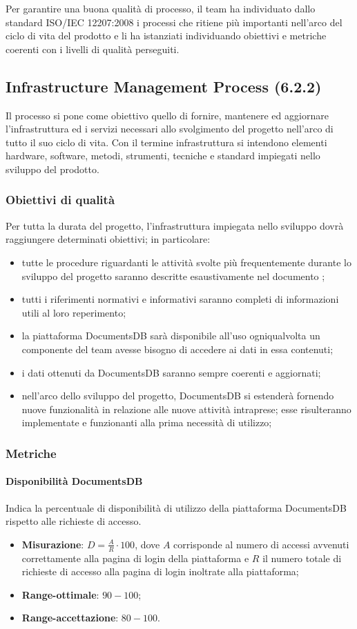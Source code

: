 Per garantire una buona qualità di processo, il team ha individuato dallo standard ISO/IEC 12207:2008 i processi che ritiene più importanti nell'arco del ciclo di vita del prodotto e li ha istanziati individuando obiettivi e metriche coerenti con i livelli di qualità perseguiti.
\subsection{Infrastructure Management Process (6.2.2)}
Il processo si pone come obiettivo quello di fornire, mantenere ed aggiornare l'infrastruttura ed i servizi necessari allo svolgimento del progetto nell'arco di tutto il suo ciclo di vita. Con il termine infrastruttura si intendono elementi hardware, software, metodi, strumenti, tecniche e standard impiegati nello sviluppo del prodotto.
\subsubsection{Obiettivi di qualità}
Per tutta la durata del progetto, l'infrastruttura impiegata nello sviluppo dovrà raggiungere determinati obiettivi; in particolare:
\begin{itemize}
\item tutte le procedure riguardanti le attività svolte più frequentemente durante lo sviluppo del progetto saranno descritte esaustivamente nel documento \textit{\NdP};
\item tutti i riferimenti normativi e informativi saranno completi di informazioni utili al loro reperimento;
\item la piattaforma DocumentsDB sarà disponibile all'uso ogniqualvolta un componente del team avesse bisogno di accedere ai dati in essa contenuti;
\item i dati ottenuti da DocumentsDB saranno sempre coerenti e aggiornati;
\item nell'arco dello sviluppo del progetto, DocumentsDB si estenderà fornendo nuove funzionalità in relazione alle nuove attività intraprese; esse risulteranno implementate e funzionanti alla prima necessità di utilizzo;
\end{itemize}
\subsubsection{Metriche}
\paragraph{Disponibilità DocumentsDB}
\label{dispDocumentsDB}
Indica la percentuale di disponibilità di utilizzo della piattaforma DocumentsDB rispetto alle richieste di accesso.
\begin{itemize}
\item \textbf{Misurazione}: $ D = \frac{A}{R} \cdot 100 $, dove $A$ corrisponde al numero di accessi avvenuti correttamente alla pagina di login della piattaforma e $R$ il numero totale di richieste di accesso alla pagina di login inoltrate alla piattaforma;
\item \textbf{Range-ottimale}: $90 - 100$;
\item \textbf{Range-accettazione}: $80 - 100$.
\end{itemize}
